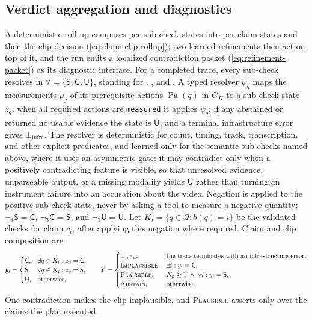 \subsection{Verdict aggregation and diagnostics}
\label{sec:semantics}
A deterministic roll-up composes per-sub-check states into per-claim states and then the clip
decision (\cref{eq:claim-clip-rollup}); two learned refinements then act on top of it, and the run
emits a localized contradiction packet (\cref{eq:refinement-packet}) as its diagnostic interface.
For a completed trace, every sub-check resolves in
$\mathbb{V}=\{\mathsf{S},\mathsf{C},\mathsf{U}\}$, standing for \supported{},
\contradicted{}, and \unknownv{}. A typed resolver $\psi_q$ maps the measurements
$\mu_j$ of its prerequisite actions $\operatorname{Pa}(q)$ in $G_{\Pi}$ to a
sub-check state $z_q$: when all required actions are \texttt{measured} it applies
$\psi_q$; if any abstained or returned no usable evidence the state is
$\mathsf{U}$; and a terminal infrastructure error gives $\bot_{\mathrm{infra}}$.
The resolver is deterministic for count, timing,
track, transcription, and other explicit predicates, and learned only for the
semantic sub-checks named above, where it uses an asymmetric gate: it may
contradict only when a positively contradicting feature is visible, so that
unresolved evidence, unparseable output, or a missing modality yields
$\mathsf{U}$ rather than turning an instrument failure into an accusation about
the video.
Negation is applied to the positive sub-check state, never by asking a tool to
measure a negative quantity: $\neg_3\mathsf{S}=\mathsf{C}$,
$\neg_3\mathsf{C}=\mathsf{S}$, and $\neg_3\mathsf{U}=\mathsf{U}$.
Let $K_i=\{q\in\mathcal Q:b(q)=i\}$ be the validated checks for claim $c_i$,
after applying this negation where required. Claim and clip composition are
\begin{equation}
y_i=
\begin{cases}
\mathsf{C}, & \exists q\in K_i:z_q=\mathsf{C},\\
\mathsf{S}, & \forall q\in K_i:z_q=\mathsf{S},\\
\mathsf{U}, & \text{otherwise},
\end{cases}
\qquad
Y=
\begin{cases}
\bot_{\mathrm{infra}}, & \text{the trace terminates with an infrastructure error},\\
\textsc{Implausible}, & \exists i:y_i=\mathsf{C},\\
\textsc{Plausible}, & N_p\geq1\ \land\ \forall i:y_i=\mathsf{S},\\
\textsc{Abstain}, & \text{otherwise}.
\end{cases}
\label{eq:claim-clip-rollup}
\end{equation}
One contradiction makes the clip implausible, and \textsc{Plausible} asserts only over the claims the plan executed.

